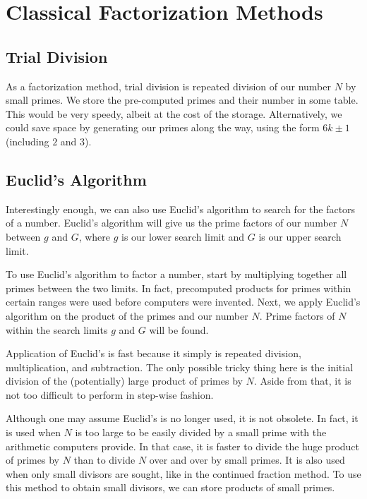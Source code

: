 \documentclass{article}
\begin{document}
\section{Classical Factorization Methods}

\subsection{ Trial Division }
\par As a factorization method, trial division is repeated division of our number $N$ by
small primes. We store the pre-computed primes and their number in some table. This would be very
speedy, albeit at the cost of the storage. Alternatively, we could save space by generating our
primes along the way, using the form $6k \pm 1$ (including $2$ and $3$).

\subsection{ Euclid's Algorithm }
\par Interestingly enough, we can also use Euclid's algorithm to search for the factors of a
number. Euclid's algorithm will give us the prime factors of our number $N$ between $g$ and $G$, where
$g$ is our lower search limit and $G$ is our upper search limit.

\par To use Euclid's algorithm to factor a number, start by multiplying together all primes between
the two limits. In fact, precomputed products for primes within certain ranges were used before
computers were invented. Next, we apply Euclid's algorithm on the product of the primes and our number
$N$. Prime factors of $N$ within the search limits $g$ and $G$ will be found.

\par Application of Euclid's is fast because it simply is repeated division, multiplication, and
subtraction. The only possible tricky thing here is the initial division of the (potentially) large product
of primes by $N$. Aside from that, it is not too difficult to perform in step-wise fashion.

\par Although one may assume Euclid's is no longer used, it is not obsolete. In fact, it is used when $N$ is
too large to be easily divided by a small prime with the arithmetic computers provide. In that case, it
is faster to divide the huge product of primes by $N$ than to divide $N$ over and over by small primes.
It is also used when only small divisors are sought, like in the continued fraction method. To use this method
to obtain small divisors, we can store products of small primes.
\end{document}
